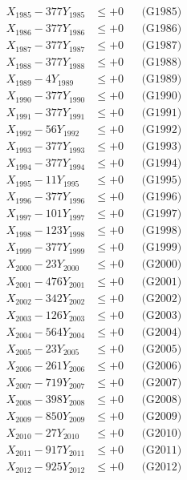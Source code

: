 \documentclass[a4paper,10pt]{article}
\begin{document}
{\begin{align}
X_{1985} - 377Y_{1985} &\leq +0 && \text{(G1985)} \\
X_{1986} - 377Y_{1986} &\leq +0 && \text{(G1986)} \\
X_{1987} - 377Y_{1987} &\leq +0 && \text{(G1987)} \\
X_{1988} - 377Y_{1988} &\leq +0 && \text{(G1988)} \\
X_{1989} - 4Y_{1989} &\leq +0 && \text{(G1989)} \\
X_{1990} - 377Y_{1990} &\leq +0 && \text{(G1990)} \\
\allowbreak
X_{1991} - 377Y_{1991} &\leq +0 && \text{(G1991)} \\
X_{1992} - 56Y_{1992} &\leq +0 && \text{(G1992)} \\
X_{1993} - 377Y_{1993} &\leq +0 && \text{(G1993)} \\
X_{1994} - 377Y_{1994} &\leq +0 && \text{(G1994)} \\
X_{1995} - 11Y_{1995} &\leq +0 && \text{(G1995)} \\
X_{1996} - 377Y_{1996} &\leq +0 && \text{(G1996)} \\
X_{1997} - 101Y_{1997} &\leq +0 && \text{(G1997)} \\
X_{1998} - 123Y_{1998} &\leq +0 && \text{(G1998)} \\
X_{1999} - 377Y_{1999} &\leq +0 && \text{(G1999)} \\
X_{2000} - 23Y_{2000} &\leq +0 && \text{(G2000)} \\
\allowbreak
X_{2001} - 476Y_{2001} &\leq +0 && \text{(G2001)} \\
X_{2002} - 342Y_{2002} &\leq +0 && \text{(G2002)} \\
X_{2003} - 126Y_{2003} &\leq +0 && \text{(G2003)} \\
X_{2004} - 564Y_{2004} &\leq +0 && \text{(G2004)} \\
X_{2005} - 23Y_{2005} &\leq +0 && \text{(G2005)} \\
X_{2006} - 261Y_{2006} &\leq +0 && \text{(G2006)} \\
X_{2007} - 719Y_{2007} &\leq +0 && \text{(G2007)} \\
X_{2008} - 398Y_{2008} &\leq +0 && \text{(G2008)} \\
X_{2009} - 850Y_{2009} &\leq +0 && \text{(G2009)} \\
X_{2010} - 27Y_{2010} &\leq +0 && \text{(G2010)} \\
\allowbreak
X_{2011} - 917Y_{2011} &\leq +0 && \text{(G2011)} \\
X_{2012} - 925Y_{2012} &\leq +0 && \text{(G2012)} \\

\end{align}}
\end{document}
